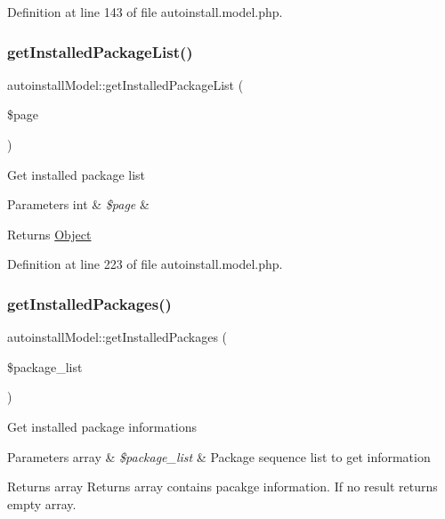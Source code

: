 Definition at line 143 of file autoinstall.\+model.\+php.

\hypertarget{classautoinstallModel_a2f132c9c41e1689b3e28df6097dae238}{}\label{classautoinstallModel_a2f132c9c41e1689b3e28df6097dae238} 
\subsubsection{\texorpdfstring{get\+Installed\+Package\+List()}{getInstalledPackageList()}}
{\footnotesize\ttfamily autoinstall\+Model\+::get\+Installed\+Package\+List (\begin{DoxyParamCaption}\item[{}]{\$page }\end{DoxyParamCaption})}

Get installed package list


\begin{DoxyParams}[1]{Parameters}
int & {\em \$page} & \\
\hline
\end{DoxyParams}
\begin{DoxyReturn}{Returns}
\hyperlink{classObject}{Object} 
\end{DoxyReturn}


Definition at line 223 of file autoinstall.\+model.\+php.

\hypertarget{classautoinstallModel_a91d9fe9fc6776b5338fca658b5b1a6d8}{}\label{classautoinstallModel_a91d9fe9fc6776b5338fca658b5b1a6d8} 
\subsubsection{\texorpdfstring{get\+Installed\+Packages()}{getInstalledPackages()}}
{\footnotesize\ttfamily autoinstall\+Model\+::get\+Installed\+Packages (\begin{DoxyParamCaption}\item[{}]{\$package\+\_\+list }\end{DoxyParamCaption})}

Get installed package informations


\begin{DoxyParams}[1]{Parameters}
array & {\em \$package\+\_\+list} & Package sequence list to get information \\
\hline
\end{DoxyParams}
\begin{DoxyReturn}{Returns}
array Returns array contains pacakge information. If no result returns empty array. 
\end{DoxyReturn}


